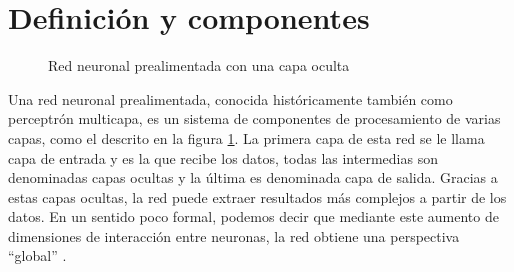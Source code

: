 \section{Definición y componentes}

\begin{figure}[htbp!]
    \centering
    \caption{Red neuronal prealimentada con una capa oculta}
    \label{fig:mlp}
\end{figure}

Una red neuronal prealimentada, conocida históricamente también como perceptrón multicapa, es un sistema de componentes 
de procesamiento de varias capas, como el descrito en la figura \ref{fig:mlp}. La primera capa de esta red se le llama 
capa de entrada y es la que recibe los datos, todas las intermedias son denominadas capas ocultas y la última es 
denominada capa de salida. Gracias a estas capas ocultas, la red puede extraer resultados más complejos a partir de los 
datos. En un sentido poco formal, podemos decir que mediante este aumento de dimensiones de interacción entre neuronas, 
la red obtiene una perspectiva ``global'' \cite{haykin_1999}. 

